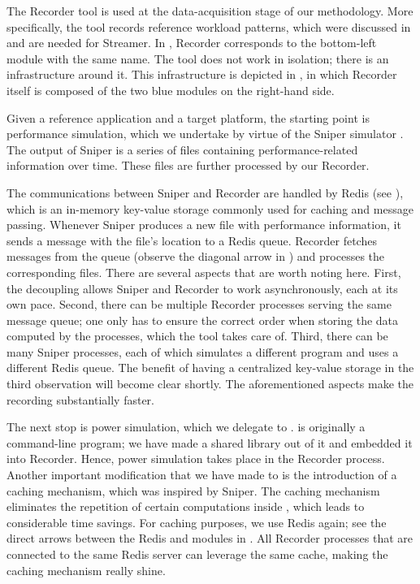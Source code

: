 
The Recorder tool is used at the data-acquisition stage of our methodology. More
specifically, the tool records reference workload patterns, which were discussed
in  and are needed for Streamer. In , Recorder
corresponds to the bottom-left module with the same name. The tool does not work
in isolation; there is an infrastructure around it. This infrastructure is
depicted in , in which Recorder itself is composed of the two
blue modules on the right-hand side.

Given a reference application and a target platform, the starting point is
performance simulation, which we undertake by virtue of the Sniper simulator
\cite{carlson2011}. The output of Sniper is a series of files containing
performance-related information over time. These files are further processed by
our Recorder.

The communications between Sniper and Recorder are handled by Redis \cite{redis}
(see ), which is an in-memory key-value storage commonly used for
caching and message passing. Whenever Sniper produces a new file with
performance information, it sends a message with the file's location to a Redis
queue. Recorder fetches messages from the queue (observe the diagonal arrow in
) and processes the corresponding files. There are several
aspects that are worth noting here. First, the decoupling allows Sniper and
Recorder to work asynchronously, each at its own pace. Second, there can be
multiple Recorder processes serving the same message queue; one only has to
ensure the correct order when storing the data computed by the processes, which
the tool takes care of. Third, there can be many Sniper processes, each of which
simulates a different program and uses a different Redis queue. The benefit of
having a centralized key-value storage in the third observation will become
clear shortly. The aforementioned aspects make the recording substantially
faster.

The next stop is power simulation, which we delegate to 
\cite{li2009}.  is originally a command-line program; we have made a
shared library out of it and embedded it into Recorder. Hence, power simulation
takes place in the Recorder process. Another important modification that we have
made to  is the introduction of a caching mechanism, which was
inspired by Sniper. The caching mechanism eliminates the repetition of certain
computations inside , which leads to considerable time savings. For
caching purposes, we use Redis again; see the direct arrows between the Redis
and  modules in . All Recorder processes that are
connected to the same Redis server can leverage the same cache, making the
caching mechanism really shine.

